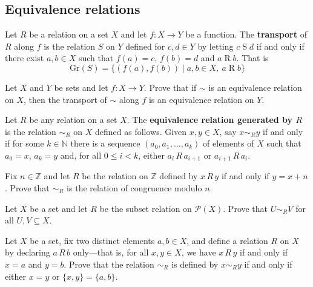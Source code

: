 \subsection*{Equivalence relations}

\begin{definition}
\label{defTransportOfRelation}
Let $R$ be a relation on a set $X$ and let $f : X \to Y$ be a function. The \textbf{transport} of $R$ along $f$ is the relation $S$ on $Y$ defined for $c,d \in Y$ by letting $c \mathrel{S} d$ if and only if there exist $a,b \in X$ such that $f(a)=c$, $f(b)=d$ and $a \mathrel{R} b$. That is
\[ \mathrm{Gr}(S) = \{ (f(a), f(b)) \mid a,b \in X,~ a \mathrel{R} b \} \]
\end{definition}

\begin{chapex}
Let $X$ and $Y$ be sets and let $f : X \to Y$. Prove that if $\sim$ is an equivalence relation on $X$, then the transport of $\sim$ along $f$ is an equivalence relation on $Y$.
\end{chapex}

\begin{definition}
\label{defEquivalenceRelationGeneratedByRelation}
Let $R$ be any relation on a set $X$. The \textbf{equivalence relation generated by $R$} is the relation ${\sim}_R$ on $X$ defined as follows. Given $x,y \in X$, say $x \sim_R y$ if and only if for some $k \in \mathbb{N}$ there is a sequence $(a_0, a_1, \dots, a_k)$ of elements of $X$ such that $a_0=x$, $a_k=y$ and, for all $0 \le i < k$, either $a_i\,R\,a_{i+1}$ or $a_{i+1}\,R\,a_i$.
\end{definition}

\begin{chapex}
\label{cqEquivalenceRelationGeneratedByRelationBegin}
Fix $n \in \mathbb{Z}$ and let $R$ be the relation on $\mathbb{Z}$ defined by $x\,R\,y$ if and only if $y=x+n$. Prove that ${\sim}_R$ is the relation of congruence modulo $n$.
\end{chapex}

\begin{chapex}
Let $X$ be a set and let $R$ be the subset relation on $\mathcal{P}(X)$. Prove that $U \mathrel{{\sim}_R} V$ for all $U, V \subseteq X$.
\end{chapex}

\begin{chapex}
\label{cqEquivalenceRelationGeneratedByRelationEnd}
Let $X$ be a set, fix two distinct elements $a,b \in X$, and define a relation $R$ on $X$ by declaring $a\,R\,b$ only---that is, for all $x,y \in X$, we have $x\,R\,y$ if and only if $x=a$ and $y=b$. Prove that the relation ${\sim}_R$ is defined by $x \sim_R y$ if and only if either $x=y$ or $\{x,y\} = \{a,b\}$.
\end{chapex}

